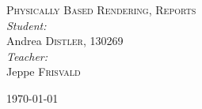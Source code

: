 \documentclass[a4paper]{article}
\begin{document}
\begin{titlepage}
\textsc{\LARGE Physically Based Rendering, Reports}\\[1.5cm]

\emph{Student:}\\
Andrea \textsc{Distler}, 130269\\[1.5cm]

\emph{Teacher:}\\
Jeppe \textsc{Frisvald}\\

\vfill

{\large \today}
\end{titlepage}

\tableofcontents


\newpage


\newpage


\newpage


\newpage

\end{document}
